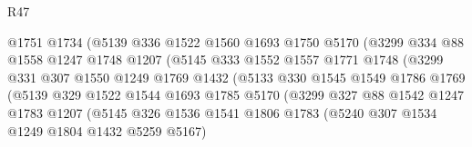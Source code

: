 \begin{lexlean}{R47}
\begin{coremodule}
                                @1751
                                @1734
                                (@5139
                                  @336
                                  @1522
                                  @1560
                                  @1693
                                  @1750
                                  @5170
                                  (@3299
                                    @334
                                    @88
                                    @1558
                                    @1247
                                    @1748
                                    @1207
                                    (@5145
                                      @333
                                      @1552
                                      @1557
                                      @1771
                                      @1748
                                      (@3299
                                        @331
                                        @307
                                        @1550
                                        @1249
                                        @1769
                                        @1432
                                        (@5133
                                          @330
                                          @1545
                                          @1549
                                          @1786
                                          @1769
                                          (@5139
                                            @329
                                            @1522
                                            @1544
                                            @1693
                                            @1785
                                            @5170
                                            (@3299
                                              @327
                                              @88
                                              @1542
                                              @1247
                                              @1783
                                              @1207
                                              (@5145
                                                @326
                                                @1536
                                                @1541
                                                @1806
                                                @1783
                                                (@5240 @307 @1534 @1249 @1804 @1432 @5259 @5167)

\end{coremodule}
\end{lexlean}
